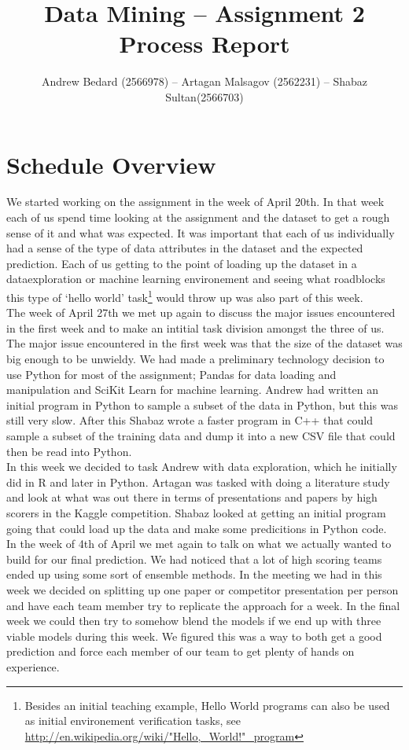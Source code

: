 \documentclass{llncs}
\title{Data Mining -- Assignment 2 Process Report}
\author{Andrew Bedard (2566978) -- Artagan Malsagov (2562231)  -- Shabaz Sultan(2566703)}
\institute{}
\begin{document}
\maketitle
\section{Schedule Overview}
We started working on the assignment in the week of April 20th. In that week each of us spend time looking at the assignment and the dataset to get a rough sense of it and what was expected. It was important that each of us individually had a sense of the type of data attributes in the dataset and the expected prediction. Each of us getting to the point of loading up the dataset in a dataexploration or machine learning environement and seeing what roadblocks this type of `hello world' task\footnote{Besides an initial teaching example, Hello World programs can also be used as initial environement verification tasks, see \url{http://en.wikipedia.org/wiki/"Hello,_World!"_program}} would throw up was also part of this week.\\
The week of April 27th we met up again to discuss the major issues encountered in the first week and to make an intitial task division amongst the three of us. The major issue encountered in the first week was that the size of the dataset was big enough to be unwieldy. We had made a preliminary technology decision to use Python for most of the assignment; Pandas for data loading and manipulation and SciKit Learn for machine learning. Andrew had written an initial program in Python to sample a subset of the data in Python, but this was still very slow. After this Shabaz wrote a faster program in C++ that could sample a subset of the training data and dump it into a new CSV file that could then be read into Python.\\
In this week we decided to task Andrew with data exploration, which he initially did in R and later in Python. Artagan was tasked with doing a literature study and look at what was out there in terms of presentations and papers by high scorers in the Kaggle competition. Shabaz looked at getting an initial program going that could load up the data and make some predicitions in Python code.\\
In the week of 4th of April we met again to talk on what we actually wanted to build for our final prediction. We had noticed that a lot of high scoring teams ended up using some sort of ensemble methods. In the meeting we had in this week we decided on splitting up one paper or competitor presentation per person and have each team member try to replicate the approach for a week. In the final week we could then try to somehow blend the models if we end up with three viable models during this week. We figured this was a way to both get a good prediction and force each member of our team to get plenty of hands on experience.\\
\end{document}
